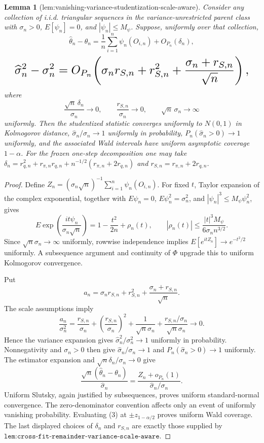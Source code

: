 \documentclass{article}
\newtheorem{lemma}{Lemma}
\begin{document}
\begin{lemma}[lem:vanishing-variance-studentization-scale-aware]\label{lem:vanishing-variance-studentization-scale-aware}
Consider any collection of i.i.d. triangular sequences in the variance-unrestricted parent class with \(\sigma_n>0\), \(E[\psi_n]=0\), and \(|\psi_n|\le M_\psi\). Suppose, uniformly over that collection,
\[
\widehat\theta_n-\theta_n=\frac1n\sum_{i=1}^n\psi_n(O_{i,n})+O_{P_n}(\delta_n),
\]
\[
\makebox[\linewidth][c]{\resizebox{0.98\linewidth}{!}{\par\noindent \makebox[\linewidth][c]{\resizebox{0.98\linewidth}{!}{\(\displaystyle \displaystyle \widehat\sigma_n^2-\sigma_n^2=O_{P_n}\!\left(\sigma_n r_{S,n}+r_{S,n}^2+\frac{\sigma_n+r_{S,n}}{\sqrt n}\right),\)}}\par\noindent}}
\]
where
\[
\frac{\sqrt n\,\delta_n}{\sigma_n}\to0,\qquad \frac{r_{S,n}}{\sigma_n}\to0,\qquad \sqrt n\,\sigma_n\to\infty
\]
uniformly. Then the studentized statistic converges uniformly to \(N(0,1)\) in Kolmogorov distance, \(\widehat\sigma_n/\sigma_n\to1\) uniformly in probability, \(P_n(\widehat\sigma_n>0)\to1\) uniformly, and the associated Wald intervals have uniform asymptotic coverage \(1-\alpha\). For the frozen one-step decomposition one may take \(\delta_n=r_{q,n}^2+r_{\pi,n}r_{q,n}+n^{-1/2}(r_{\pi,n}+2r_{q,n})\) and \(r_{S,n}=r_{\pi,n}+2r_{q,n}\).
\end{lemma}
\begin{proof}
Define \(Z_n=(\sigma_n\sqrt n)^{-1}\sum_{i=1}^n\psi_n(O_{i,n})\). For fixed \(t\), Taylor expansion of the complex exponential, together with \(E\psi_n=0\), \(E\psi_n^2=\sigma_n^2\), and \(|\psi_n|^3\le M_\psi\psi_n^2\), gives
\[E\exp\!\left(\frac{it\psi_n}{\sigma_n\sqrt n}\right)=1-\frac{t^2}{2n}+\rho_n(t),\qquad |\rho_n(t)|\le\frac{|t|^3M_\psi}{6\sigma_nn^{3/2}}.\tag{1}\]
Since \(\sqrt n\sigma_n\to\infty\) uniformly, rowwise independence implies \(E[e^{itZ_n}]\to e^{-t^2/2}\) uniformly. A subsequence argument and continuity of \(\Phi\) upgrade this to uniform Kolmogorov convergence.

Put
\[a_n=\sigma_nr_{S,n}+r_{S,n}^2+\frac{\sigma_n+r_{S,n}}{\sqrt n}.\]
The scale assumptions imply
\[\frac{a_n}{\sigma_n^2}=\frac{r_{S,n}}{\sigma_n}+\left(\frac{r_{S,n}}{\sigma_n}\right)^2+\frac1{\sqrt n\sigma_n}+\frac{r_{S,n}/\sigma_n}{\sqrt n\sigma_n}\longrightarrow0.\tag{2}\]
Hence the variance expansion gives \(\widehat\sigma_n^2/\sigma_n^2\to1\) uniformly in probability. Nonnegativity and \(\sigma_n>0\) then give \(\widehat\sigma_n/\sigma_n\to1\) and \(P_n(\widehat\sigma_n>0)\to1\) uniformly. The estimator expansion and \(\sqrt n\delta_n/\sigma_n\to0\) give
\[\frac{\sqrt n(\widehat\theta_n-\theta_n)}{\widehat\sigma_n}=\frac{Z_n+o_{P_n}(1)}{\widehat\sigma_n/\sigma_n}.\tag{3}\]
Uniform Slutsky, again justified by subsequences, proves uniform standard-normal convergence. The zero-denominator convention affects only an event of uniformly vanishing probability. Evaluating (3) at \(\pm z_{1-\alpha/2}\) proves uniform Wald coverage. The last displayed choices of \(\delta_n\) and \(r_{S,n}\) are exactly those supplied by \(\texttt{lem:cross-fit-remainder-variance-scale-aware}\).
\end{proof}
\end{document}
